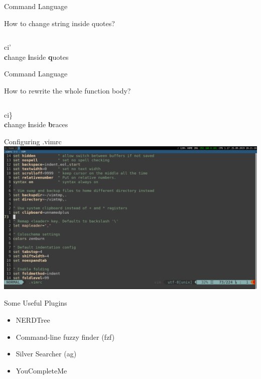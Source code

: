 \documentclass{beamer}
\begin{document}
\begin{frame}{Command Language}
    \begin{block}{How to change string inside quotes?}
    \end{block}
    \inputminted{js}{codes/changeInsideQuotes.js}
    \pause
    \begin{center}
        \huge
        ci'
        \\
        \textbf{c}hange \textbf{i}nside \textbf{q}uotes
    \end{center}
\end{frame}

\begin{frame}{Command Language}
    \begin{block}{How to rewrite the whole function body?}
    \end{block}
    \inputminted{js}{codes/changeInsideBlock.js}
    \pause
    \begin{center}
        \huge
        ci\}
        \\
        \textbf{c}hange \textbf{i}nside \textbf{b}races
    \end{center}
\end{frame}

\begin{frame}{Configuring .vimrc}
    \includegraphics[width=1\textwidth]{images/vimrc.png}
\end{frame}

\begin{frame}{Some Useful Plugins}
    \begin{itemize}
        \item NERDTree
        \item Command-line fuzzy finder (fzf)
        \item Silver Searcher (ag)
        \item YouCompleteMe
    \end{itemize}
\end{frame}
\end{document}
